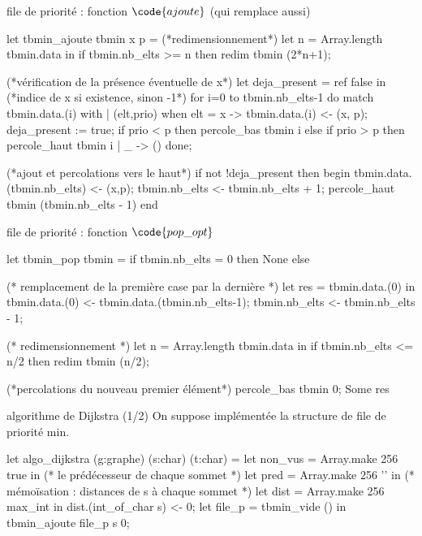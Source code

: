 \begin{adjustwidth}{-3cm}{-3cm}
\begin{implementation}{file de priorité : fonction $\code{ajoute}$ (qui remplace aussi)}
    \begin{lstOCaml}
    let tbmin_ajoute tbmin x p  =
        (*redimensionnement*)
        let n = Array.length tbmin.data in
        if tbmin.nb_elts >= n then 
            redim tbmin (2*n+1);
    
        (*vérification de la présence éventuelle de x*)
        let deja_present = ref false in (*indice de x si existence, sinon -1*)
        for i=0 to tbmin.nb_elts-1 do
            match tbmin.data.(i) with
            | (elt,prio) when elt = x -> 
                tbmin.data.(i) <- (x, p); 
                deja_present := true;
                if prio < p then 
                percole_bas tbmin i
                else if prio > p then
                percole_haut tbmin i
            | _ -> ()
        done;
    
        (*ajout et percolations vers le haut*)
        if not !deja_present then begin
            tbmin.data.(tbmin.nb_elts) <- (x,p);
            tbmin.nb_elts <- tbmin.nb_elts + 1;
            percole_haut tbmin (tbmin.nb_elts - 1)
        end
    \end{lstOCaml}
\end{implementation}

\begin{implementation}{file de priorité : fonction $\code{pop\_opt}$}
    \begin{lstOCaml}
    let tbmin_pop tbmin =
        if tbmin.nb_elts = 0 then None else
    
     (* remplacement de la première case par la dernière *)
        let res =  tbmin.data.(0) in 
        tbmin.data.(0) <- tbmin.data.(tbmin.nb_elts-1);
        tbmin.nb_elts <- tbmin.nb_elts - 1;
    
     (* redimensionnement *)
        let n = Array.length tbmin.data in
        if tbmin.nb_elts <= n/2 then 
            redim tbmin (n/2);
    
        (*percolations du nouveau premier élément*)
        percole_bas tbmin 0;
        Some res
    \end{lstOCaml}
\end{implementation}

\begin{implementation}{algorithme de Dijkstra (1/2)}
    On suppose implémentée la structure de file de priorité min.
    \begin{lstOCaml}
    let algo_dijkstra (g:graphe) (s:char) (t:char) =
        let non_vus = Array.make 256 true in
     (* le prédécesseur de chaque sommet *)
        let pred = Array.make 256 '' in 
     (* mémoïsation : distances de s à chaque sommet *)
        let dist = Array.make 256 max_int in 
        dist.(int_of_char s) <- 0;
        let file_p = tbmin_vide () in
        tbmin_ajoute file_p s 0;
    

\end{lstOCaml}
\end{implementation}
\end{adjustwidth}
